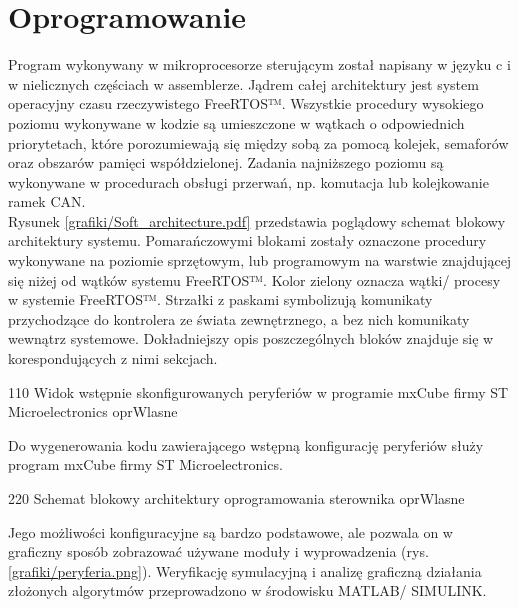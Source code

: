 \section{Oprogramowanie}
\label{s:oprogramowanie}

Program wykonywany w mikroprocesorze sterującym został napisany w języku c i w nielicznych częściach w assemblerze. Jądrem całej architektury jest system operacyjny czasu rzeczywistego FreeRTOS™. Wszystkie procedury wysokiego poziomu wykonywane w kodzie są umieszczone w wątkach o odpowiednich priorytetach, które porozumiewają się między sobą za pomocą kolejek, semaforów oraz obszarów pamięci współdzielonej. Zadania najniższego poziomu są wykonywane w procedurach obsługi przerwań, np. komutacja lub kolejkowanie ramek CAN. \\

Rysunek \ref{grafiki/Soft_architecture.pdf} przedstawia poglądowy schemat blokowy architektury systemu. Pomarańczowymi blokami zostały oznaczone procedury wykonywane na poziomie sprzętowym, lub programowym na warstwie znajdującej się niżej od wątków systemu FreeRTOS™. Kolor zielony oznacza wątki/ procesy w systemie FreeRTOS™. Strzałki z paskami symbolizują komunikaty przychodzące do kontrolera ze świata zewnętrznego, a bez nich komunikaty wewnątrz systemowe. Dokładniejszy opis poszczególnych bloków znajduje się w korespondujących z nimi sekcjach.

	{110}
	{Widok wstępnie skonfigurowanych peryferiów w programie mxCube firmy ST Microelectronics}
	{oprWlasne}
	
Do wygenerowania kodu zawierającego wstępną konfigurację peryferiów służy program mxCube firmy ST Microelectronics.
	
	{220}
	{Schemat blokowy architektury oprogramowania sterownika}
	{oprWlasne}
	
\clearpage

Jego możliwości konfiguracyjne są bardzo podstawowe, ale pozwala on w graficzny sposób zobrazować używane moduły i wyprowadzenia (rys. \ref{grafiki/peryferia.png}). Weryfikację symulacyjną i analizę graficzną działania złożonych algorytmów przeprowadzono w środowisku MATLAB/ SIMULINK.
























\clearpage